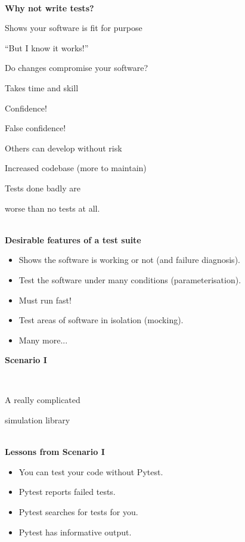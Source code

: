 \documentclass[12pt]{article}
\newlength{\geometrytop}
\newcommand{\slidetitle}[1]{~\\[-0.5ex]{\Large\bf{\color{bold}#1}}\\}
\begin{document}
\slidetitle{Why {\color{red}not} write tests?}
\begin{itemize}[itemsep=-2.9pt]
\item Shows your software is fit for purpose
{\color{red} \item[] \hfill ``But I know it works!''}
\item Do changes compromise your software?
{\color{red} \item[] \hfill Takes time and skill}
\item Confidence!
{\color{red} \item[] \hfill False confidence!}
\item Others can develop without risk
{\color{red} \item[] \hfill Increased codebase (more to maintain)}
\end{itemize}
\clearpage

\thispagestyle{plain}
\vspace*{-\topskip}
\vspace*{\fill}
{\LARGE\centerline{Tests done badly are}
\centerline{worse than no tests at all.}}
\vspace*{\fill}
\vspace*{\geometrytop}
\clearpage


\slidetitle{Desirable features of a test suite}
\begin{itemize}
\item Shows the software is working or not (and failure diagnosis).
\item Test the software under many conditions (parameterisation).
\item Must run fast!
\item Test areas of software in isolation (mocking).
\item Many more...
\end{itemize}
\clearpage

\thispagestyle{plain}
\vspace*{-\topskip}
\vspace*{\fill}
{\Huge\centerline{\textbf{Scenario I}}~\newline
\centerline{A really complicated}
\centerline{simulation library}}
\vspace*{\fill}
\vspace*{\geometrytop}
\clearpage

\slidetitle{Lessons from Scenario I}
\begin{itemize}
\item You can test your code without Pytest.
\item Pytest reports failed tests.
\item Pytest searches for tests for you.
\item Pytest has informative output.
\end{itemize}
\clearpage
\end{document}
